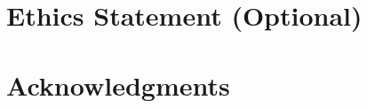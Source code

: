 \documentclass{article}
\begin{document}
\section*{Ethics Statement (Optional)}

\section*{Acknowledgments}

% 
% 
\end{document}
